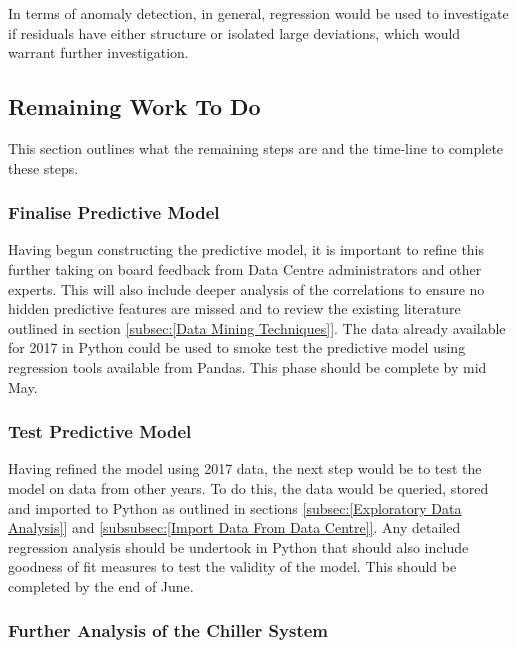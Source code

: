 \documentclass[12pt]{scrartcl}
\begin{document}
In terms of anomaly detection, in general, regression would be used to investigate if residuals have either structure or isolated large deviations, which would warrant further investigation. 

\subsection{Remaining Work To Do}
\label{subsec:[Remaining Work To Do]}
This section outlines what the remaining steps are and the time-line to complete these steps.

\subsubsection{Finalise Predictive Model}
\label{subsubsec:[Finalise Predictive Model]}

Having begun constructing the predictive model, it is important to refine this further taking on board feedback from Data Centre administrators and other experts. This will also include deeper analysis of the correlations to ensure no hidden predictive features are missed and to review the existing literature outlined in section \ref{subsec:[Data Mining Techniques]}. The data already available for 2017 in Python could be used to smoke test the predictive model using regression tools available from Pandas. This phase should be complete by mid May. 

\subsubsection{Test Predictive Model}
\label{subsubsec:[Test Predictive Model]}

Having refined the model using 2017 data, the next step would be to test the model on data from other years. To do this, the data would be queried, stored and imported to Python as outlined in sections \ref{subsec:[Exploratory Data Analysis]} and \ref{subsubsec:[Import Data From Data Centre]}. Any detailed regression analysis should be undertook in Python that should also include goodness of fit measures to test the validity of the model. This should be completed by the end of June.  

\subsubsection{Further Analysis of the Chiller System}
\label{subsubsec:[Further Analysis of the Chiller System]}
\end{document}

